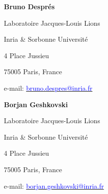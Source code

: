 \documentclass[letterpaper,11pt,twoside]{article}
\numberwithin{figure}{section}
\numberwithin{table}{section}
\theoremstyle{cpamplain}
\theoremstyle{cpamdefinition}
\numberwithin{equation}{section}
\begin{document}
\noindent\begin{minipage}[t]{.48\textwidth}
    {\footnotesize{\bf Bruno Despr\'es}\par
      Laboratoire Jacques-Louis Lions\par
      Inria \& Sorbonne Université\par
      4 Place Jussieu\par
      75005 Paris, France\par
     \par
      e-mail: \href{mailto:bruno.despres@inria.fr}{\textcolor{blue}{\scriptsize bruno.despres@inria.fr}}
      }
    \end{minipage}\hfill%
    \begin{minipage}[t]{.48\textwidth}
      {\footnotesize{\bf Borjan Geshkovski}\par
      Laboratoire Jacques-Louis Lions\par
      Inria \& Sorbonne Université\par
      4 Place Jussieu\par
      75005 Paris, France\par
     \par
      e-mail: \href{mailto:borjan.geshkovski@inria.fr}{\textcolor{blue}{\scriptsize borjan.geshkovski@inria.fr}}
      }
    \end{minipage}%
\end{document}
